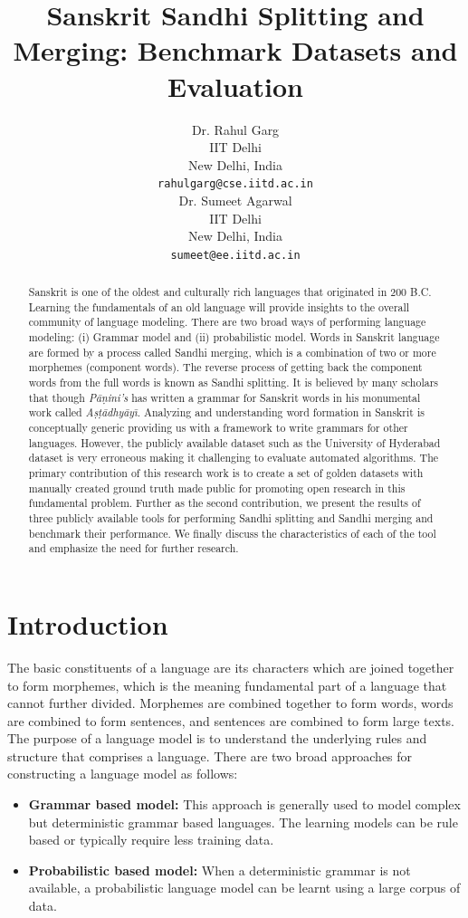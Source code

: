 \documentclass[11pt]{article}
\title{Sanskrit Sandhi Splitting and Merging: Benchmark Datasets and Evaluation}
\author{Dr. Rahul Garg \\
 IIT Delhi \\
  New Delhi, India \\
  {\tt rahulgarg@cse.iitd.ac.in} \\\And
  Dr. Sumeet Agarwal \\
  IIT Delhi \\
 New Delhi, India \\
  {\tt sumeet@ee.iitd.ac.in} \\}
\date{}
\begin{document}
	\maketitle
\begin{abstract}
	Sanskrit is one of the oldest and culturally rich languages that originated in 200 B.C. Learning the fundamentals of an old language will provide insights to the overall community of language modeling. There are two broad ways of performing language modeling: (i) Grammar model and (ii) probabilistic model. Words in Sanskrit language are formed by a process called Sandhi merging, which is a combination of two or more morphemes (component words). The reverse process of getting back the component words from the full words is known as Sandhi splitting. It is believed by many scholars that though \textit{P\={a}\d{n}ini's} has written a grammar for Sanskrit words in his monumental work called \textit{A\d{s}\d{t}\={a}dhy\={a}y\={\i}}. Analyzing and understanding word formation in Sanskrit is conceptually generic providing us with a framework to write grammars for other languages. However, the publicly available dataset such as the University of Hyderabad dataset is very erroneous making it challenging to evaluate automated algorithms. The primary contribution of this research work is to create a set of golden datasets with manually created ground truth made public for promoting open research in this fundamental problem. Further as the second contribution, we present the results of three publicly available tools for performing Sandhi splitting and Sandhi merging and benchmark their performance. We finally discuss the characteristics of each of the tool and emphasize the need for further research.
\end{abstract}

\section{Introduction}

The basic constituents of a language are its characters which are joined together to form morphemes, which is the meaning fundamental part of a language that cannot further divided. Morphemes are combined together to form words, words are combined to form sentences, and sentences are combined to form large texts. The purpose of a language model is to understand the underlying rules and structure that comprises a language. There are two broad approaches for constructing a language model as follows:
\begin{itemize}
	\item \textbf{Grammar based model:} This approach is generally used to model complex but deterministic grammar based languages. The learning models can be rule based or typically require less training data.
	\item \textbf{Probabilistic based model:} When a deterministic grammar is not available, a probabilistic language model can be learnt using a large corpus of data.
\end{itemize}
\end{document}
